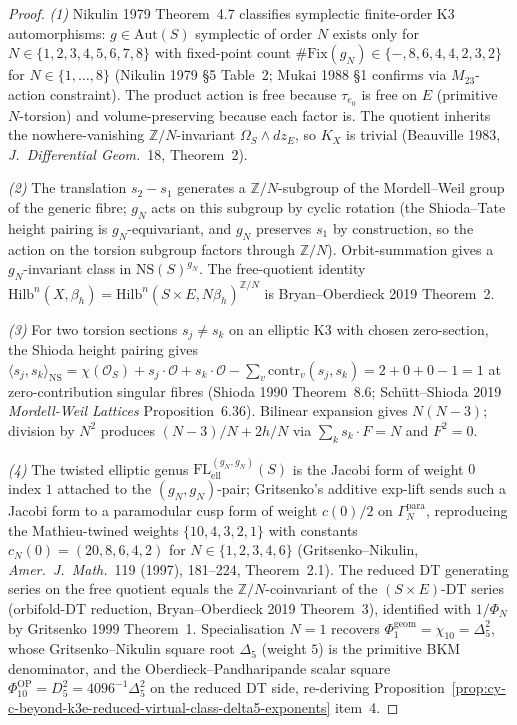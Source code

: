 \begin{proof}
\emph{(1)} Nikulin 1979 Theorem~4.7 classifies symplectic
finite-order K3 automorphisms: $g\in\mathrm{Aut}(S)$ symplectic of
order $N$ exists only for $N\in\{1,2,3,4,5,6,7,8\}$ with fixed-point
count
$\#\mathrm{Fix}(g_N) \in \{-,8,6,4,4,2,3,2\}$
for $N\in\{1,\ldots,8\}$ (Nikulin 1979 \S 5 Table~2; Mukai 1988 \S 1
confirms via $M_{23}$-action constraint). The product action is
free because $\tau_{e_0}$ is free on $E$ (primitive $N$-torsion) and
volume-preserving because each factor is. The quotient inherits the
nowhere-vanishing $\mathbb Z/N$-invariant
$\Omega_S\wedge dz_E$, so $K_X$ is trivial (Beauville 1983,
\emph{J.\ Differential Geom.}~18, Theorem~2).

\emph{(2)} The translation $s_2-s_1$ generates a
$\mathbb Z/N$-subgroup of the Mordell--Weil group of the generic
fibre; $g_N$ acts on this subgroup by cyclic rotation (the
Shioda--Tate height pairing is $g_N$-equivariant, and $g_N$
preserves $s_1$ by construction, so the action on the torsion
subgroup factors through $\mathbb Z/N$). Orbit-summation gives
a $g_N$-invariant class in $\mathrm{NS}(S)^{g_N}$. The free-quotient
identity
$\mathrm{Hilb}^n(X,\beta_h) = \mathrm{Hilb}^n(S\times E,N\beta_h)^{\mathbb Z/N}$
is Bryan--Oberdieck 2019 Theorem~2.

\emph{(3)} For two torsion sections $s_j\ne s_k$ on an elliptic K3
with chosen zero-section, the Shioda height pairing gives
$\langle s_j, s_k\rangle_{\mathrm{NS}}
 = \chi(\mathcal O_S) + s_j\cdot\mathcal O + s_k\cdot\mathcal O
 - \sum_v\mathrm{contr}_v(s_j,s_k)
 = 2 + 0 + 0 - 1 = 1$
at zero-contribution singular fibres (Shioda 1990 Theorem~8.6;
Sch\"utt--Shioda 2019 \emph{Mordell-Weil Lattices} Proposition~6.36).
Bilinear expansion gives $N(N-3)$; division by $N^2$ produces
$(N-3)/N + 2h/N$ via $\sum_k s_k\cdot F = N$ and $F^2=0$.

\emph{(4)} The twisted elliptic genus
$\mathrm{FL}^{(g_N,g_N)}_{\mathrm{ell}}(S)$ is the Jacobi form of
weight $0$ index $1$ attached to the $(g_N,g_N)$-pair; Gritsenko's
additive exp-lift sends such a Jacobi form to a paramodular cusp
form of weight $c(0)/2$ on $\Gamma^{\mathrm{para}}_N$, reproducing
the Mathieu-twined weights $\{10, 4, 3, 2, 1\}$ with constants
$c_N(0) = (20, 8, 6, 4, 2)$ for
$N\in\{1,2,3,4,6\}$ (Gritsenko--Nikulin,
\emph{Amer.\ J.\ Math.}~119 (1997), 181--224, Theorem~2.1). The reduced DT generating
series on the free quotient equals the $\mathbb Z/N$-coinvariant of
the $(S\times E)$-DT series (orbifold-DT reduction,
	Bryan--Oberdieck 2019 Theorem~3), identified with $1/\Phi_N$ by
	Gritsenko 1999 Theorem~1. Specialisation $N=1$ recovers
	$\Phi_1^{\mathrm{geom}} = \chi_{10} = \Delta_5^2$, whose
	Gritsenko--Nikulin square root $\Delta_5$ (weight $5$) is the
	primitive BKM denominator, and the
	Oberdieck--Pandharipande scalar square
	$\Phi_{10}^{\mathrm{OP}}=D_5^2=4096^{-1}\Delta_5^2$ on the reduced
	DT side, re-deriving
Proposition~\ref{prop:cy-c-beyond-k3e-reduced-virtual-class-delta5-exponents}
item~4.
\end{proof}

